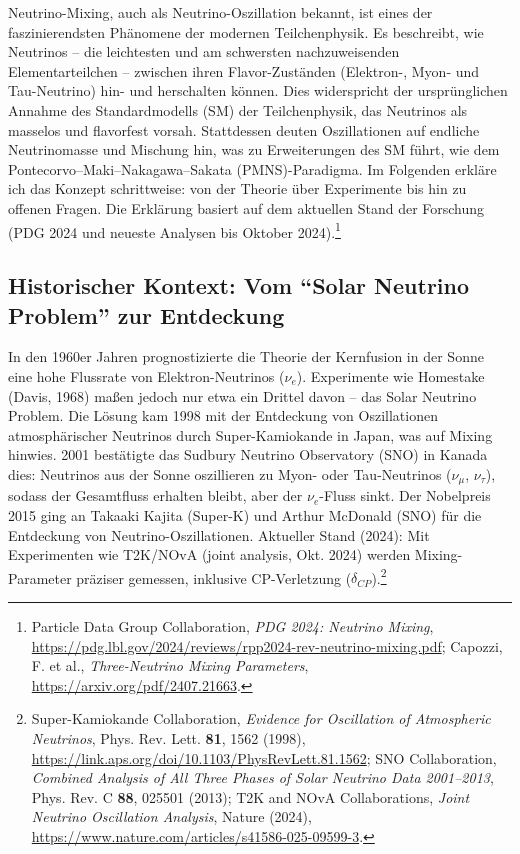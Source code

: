 	Neutrino-Mixing, auch als Neutrino-Oszillation bekannt, ist eines der faszinierendsten Phänomene der modernen Teilchenphysik. Es beschreibt, wie Neutrinos -- die leichtesten und am schwersten nachzuweisenden Elementarteilchen -- zwischen ihren Flavor-Zuständen (Elektron-, Myon- und Tau-Neutrino) hin- und herschalten können. Dies widerspricht der ursprünglichen Annahme des Standardmodells (SM) der Teilchenphysik, das Neutrinos als masselos und flavorfest vorsah. Stattdessen deuten Oszillationen auf endliche Neutrinomasse und Mischung hin, was zu Erweiterungen des SM führt, wie dem Pontecorvo--Maki--Nakagawa--Sakata (PMNS)-Paradigma. Im Folgenden erkläre ich das Konzept schrittweise: von der Theorie über Experimente bis hin zu offenen Fragen. Die Erklärung basiert auf dem aktuellen Stand der Forschung (PDG 2024 und neueste Analysen bis Oktober 2024).\footnote{Particle Data Group Collaboration, \emph{PDG 2024: Neutrino Mixing}, \url{https://pdg.lbl.gov/2024/reviews/rpp2024-rev-neutrino-mixing.pdf}; Capozzi, F. et al., \emph{Three-Neutrino Mixing Parameters}, \url{https://arxiv.org/pdf/2407.21663}.}
	
	\subsection{Historischer Kontext: Vom ``Solar Neutrino Problem'' zur Entdeckung}
	
	In den 1960er Jahren prognostizierte die Theorie der Kernfusion in der Sonne eine hohe Flussrate von Elektron-Neutrinos ($\nu_e$). Experimente wie Homestake (Davis, 1968) maßen jedoch nur etwa ein Drittel davon -- das Solar Neutrino Problem. Die Lösung kam 1998 mit der Entdeckung von Oszillationen atmosphärischer Neutrinos durch Super-Kamiokande in Japan, was auf Mixing hinwies. 2001 bestätigte das Sudbury Neutrino Observatory (SNO) in Kanada dies: Neutrinos aus der Sonne oszillieren zu Myon- oder Tau-Neutrinos ($\nu_\mu$, $\nu_\tau$), sodass der Gesamtfluss erhalten bleibt, aber der $\nu_e$-Fluss sinkt. Der Nobelpreis 2015 ging an Takaaki Kajita (Super-K) und Arthur McDonald (SNO) für die Entdeckung von Neutrino-Oszillationen. Aktueller Stand (2024): Mit Experimenten wie T2K/NOvA (joint analysis, Okt. 2024) werden Mixing-Parameter präziser gemessen, inklusive CP-Verletzung ($\delta_{CP}$).\footnote{Super-Kamiokande Collaboration, \emph{Evidence for Oscillation of Atmospheric Neutrinos}, Phys. Rev. Lett. \textbf{81}, 1562 (1998), \url{https://link.aps.org/doi/10.1103/PhysRevLett.81.1562}; SNO Collaboration, \emph{Combined Analysis of All Three Phases of Solar Neutrino Data 2001--2013}, Phys. Rev. C \textbf{88}, 025501 (2013); T2K and NOvA Collaborations, \emph{Joint Neutrino Oscillation Analysis}, Nature (2024), \url{https://www.nature.com/articles/s41586-025-09599-3}.}
	
